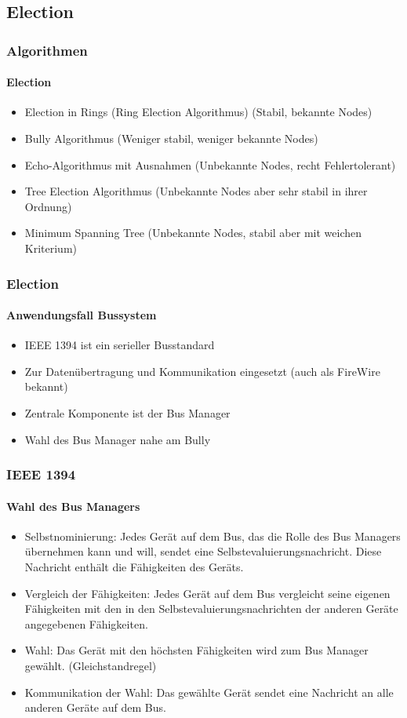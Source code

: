 \subsection{Election}
\begin{frame}
  \frametitle{Algorithmen}
  \framesubtitle{Election}
  \begin{itemize}
    \item Election in Rings (Ring Election Algorithmus) (Stabil, bekannte Nodes)
    \item Bully Algorithmus (Weniger stabil, weniger bekannte Nodes)
    \item Echo-Algorithmus mit Ausnahmen (Unbekannte Nodes, recht Fehlertolerant)
    \item Tree Election Algorithmus (Unbekannte Nodes aber sehr stabil in ihrer Ordnung)
    \item Minimum Spanning Tree (Unbekannte Nodes, stabil aber mit weichen Kriterium)
  \end{itemize}
\end{frame}

\begin{frame}
  \frametitle{Election}
  \framesubtitle{Anwendungsfall Bussystem}
  \begin{itemize}
    \item IEEE 1394 ist ein serieller Busstandard
    \item Zur Datenübertragung und Kommunikation eingesetzt (auch als FireWire bekannt)
    \item Zentrale Komponente ist der Bus Manager
    \item Wahl des Bus Manager nahe am Bully
  \end{itemize}
\end{frame}

\begin{frame}
  \frametitle{IEEE 1394}
  \framesubtitle{Wahl des Bus Managers}
  \begin{itemize}
  \item Selbstnominierung: Jedes Gerät auf dem Bus, das die Rolle des Bus Managers übernehmen kann und will, sendet eine Selbstevaluierungsnachricht. Diese Nachricht enthält die Fähigkeiten des Geräts.
  \item Vergleich der Fähigkeiten: Jedes Gerät auf dem Bus vergleicht seine eigenen Fähigkeiten mit den in den Selbstevaluierungsnachrichten der anderen Geräte angegebenen Fähigkeiten.
  \item Wahl: Das Gerät mit den höchsten Fähigkeiten wird zum Bus Manager gewählt. (Gleichstandregel)
  \item Kommunikation der Wahl: Das gewählte Gerät sendet eine Nachricht an alle anderen Geräte auf dem Bus.
  \end{itemize}
\end{frame}

